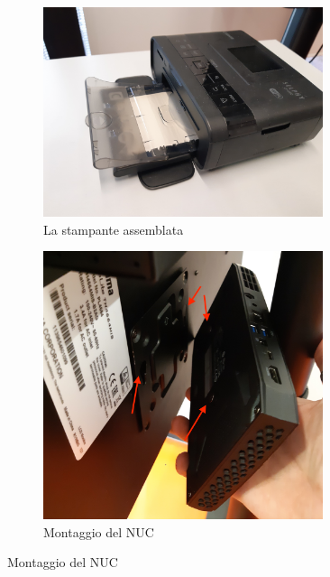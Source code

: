 \documentclass[12pt]{article}
\begin{document}
	\begin{figure}[H]
		\begin{subfigure}{0.5\textwidth}
                \includegraphics[width=0.9\textwidth]{img/printer.jpg}
                \caption*{La stampante assemblata}
		\end{subfigure}		
		\begin{subfigure}{0.5\textwidth}
                \includegraphics[width=0.9\textwidth]{img/nuc_1.jpg}
                \caption*{Montaggio del NUC}
        \end{subfigure}
    \end{figure}
        
\end{document}
